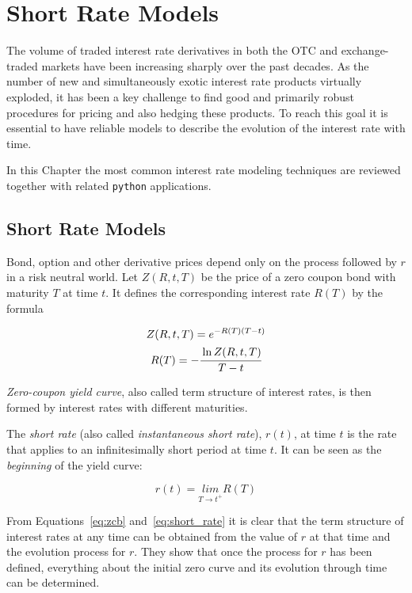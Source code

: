 \chapter{Short Rate Models}

The volume of traded interest rate derivatives in both the OTC and exchange-traded markets have been increasing sharply over the past decades. As the number of new and simultaneously exotic interest rate products virtually exploded, it has been a key challenge to find good and primarily robust procedures for pricing and also hedging these products. To reach this goal it is essential to have reliable models to describe the evolution of the interest rate with time.

In this Chapter the most common interest rate modeling techniques are reviewed together with related \texttt{python} applications.

\section{Short Rate Models}
Bond, option and other derivative prices depend only on the process followed by $r$ in a risk neutral world.
Let $Z(R, t, T)$ be the price of a zero coupon bond with maturity $T$ at time $t$. It defines the corresponding interest rate $R(T)$ by the formula

\begin{equation}
\begin{gathered}
Z(R, t, T) = e^{-R(T)(T-t)} \\
R(T) = -\cfrac{\ln Z(R, t, T)}{T-t}
\end{gathered}
\label{eq:zcb}
\end{equation}

\emph{Zero-coupon yield curve}, also called term structure of interest rates, is then formed by interest rates with different maturities.

The \emph{short rate} (also called \emph{instantaneous short rate}), $r(t)$, at time $t$ is the rate that applies to an infinitesimally short period at time $t$. It can be seen as the \emph{beginning} of the yield curve: 

\begin{equation}
r(t) = \underset{T\rightarrow t^{+}}{lim}R(T)
\label{eq:short_rate}
\end{equation}

From Equations~\ref{eq:zcb} and~\ref{eq:short_rate} it is clear that the term structure of interest rates at any time can be obtained from the value of $r$ at that time and the evolution process for $r$. They show that once the process for $r$ has been defined, everything about the initial zero curve and its evolution through time can be determined.

